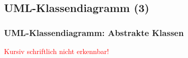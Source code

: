 \documentclass[18pt]{beamer}
\begin{document}
	\subsection{UML-Klassendiagramm (3)}
	\begin{frame}
		\frametitle{UML-Klassendiagramm: Abstrakte Klassen}
		\begin{figure}
			\footnotesize
			 \pause
		\end{figure}
		\centering \textcolor{red}{Kursiv schriftlich nicht erkennbar!}
	\end{frame}
	
\end{document}

